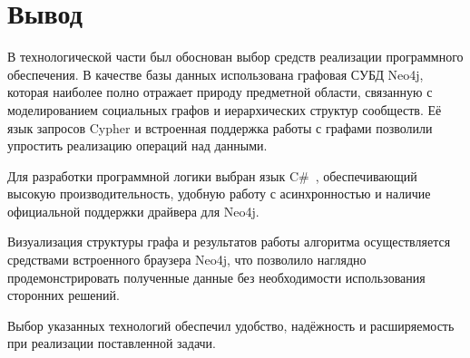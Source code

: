 \section*{Вывод}

В технологической части был обоснован выбор средств реализации программного обеспечения. В качестве базы данных использована графовая СУБД Neo4j, которая наиболее полно отражает природу предметной области, связанную с моделированием социальных графов и иерархических структур сообществ. Её язык запросов Cypher и встроенная поддержка работы с графами позволили упростить реализацию операций над данными.

Для разработки программной логики выбран язык C\#~\cite{Csharp}, обеспечивающий высокую производительность, удобную работу с асинхронностью и наличие официальной поддержки драйвера для Neo4j. 

Визуализация структуры графа и результатов работы алгоритма осуществляется средствами встроенного браузера Neo4j, что позволило наглядно продемонстрировать полученные данные без необходимости использования сторонних решений.

Выбор указанных технологий обеспечил удобство, надёжность и расширяемость при реализации поставленной задачи.

